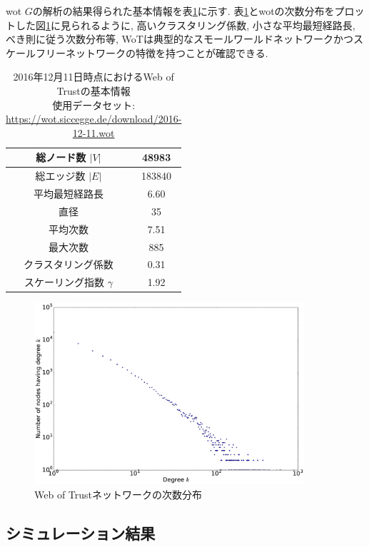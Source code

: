 \documentclass[dvipdfmx]{ampbt}
\begin{document}
  \acrshort{wot} $G$の解析の結果得られた基本情報を表\ref{table:wot_info}に示す. 表\ref{table:wot_info}と\acrshort{wot}の次数分布をプロットした図\ref{fig:wot_dd}に見られるように, 高いクラスタリング係数, 小さな平均最短経路長, べき則に従う次数分布等, WoTは典型的なスモールワールドネットワークかつスケールフリーネットワークの特徴を持つことが確認できる. 
  \begin{table}[!h]  
  \begin{center}  
   \begin{tabular}{|c|c|} \hline
    総ノード数 $|V|$ & 48983 \\ \hline
    総エッジ数 $|E|$ & 183840 \\ \hline
    平均最短経路長 & 6.60 \\ \hline
    直径 & 35 \\ \hline
    平均次数 &  7.51 \\ \hline
    最大次数 & 885 \\ \hline
    クラスタリング係数 & 0.31\\ \hline
    スケーリング指数 $\gamma$ & 1.92 \\ \hline
   \end{tabular}
  \end{center}
    \caption{2016年12月11日時点におけるWeb of Trustの基本情報 \\ 使用データセット: \url{https://wot.siccegge.de/download/2016-12-11.wot}}
 \label{table:wot_info}
  \end{table}


     \begin{figure}[!h]
      \centerline{\includegraphics[width=100mm]{../fig/wot_degree_distribution.eps}}
      \caption{Web of Trustネットワークの次数分布}
      \label{fig:wot_dd}
     \end{figure}
  \subsection{シミュレーション結果}
\end{document}
